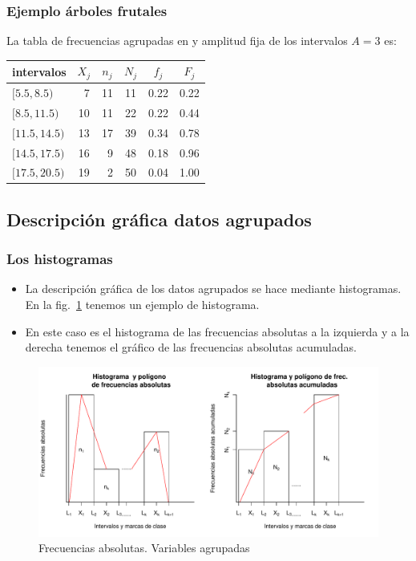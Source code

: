 \begin{frame}
\frametitle{Ejemplo árboles frutales}
La tabla de frecuencias agrupadas en  y amplitud fija de los intervalos $A=3$ es:
\begin{table}[h]
\begin{center}
\begin{tabular}{lccccc}
intervalos  & $X_j$ & $n_j$ & $N_j$ &  $f_j$ &  $F_j$ \\ \hline 
$[5.5,8.5)$  & \ 7  & 11
& 11 & 0.22 &  0.22 \\ $[8.5,11.5)$ & 10  & 11  & 22  & 0.22  & 0.44 \\ $[11.5,14.5)$ &
13 & 17  & 39  & 0.34  & 0.78 \\ $[14.5,17.5)$ & 16 & \ 9  & 48 & 0.18  & 0.96 \\
$[17.5,20.5)$ & 19   & \ 2  & 50 & 0.04  & 1.00 \\ \hline
\end{tabular}
\end{center}
\end{table}
\end{frame}

\subsection{Descripción gráfica  datos agrupados}

\begin{frame}
\frametitle{Los histogramas}
\begin{itemize}
\item La descripción gráfica  de los datos agrupados se hace mediante histogramas.
En la fig.~\ref{FAAVQC} tenemos un ejemplo de histograma.
\item En este caso es el histograma
de  las frecuencias absolutas a la izquierda y a la derecha tenemos el gráfico de las
frecuencias absolutas acumuladas.
\end{itemize}
\end{frame}

\begin{frame}
\begin{figure}
\label{FAAVQC}
\begin{center}
\includegraphics{./dibujos/01/-006}
\end{center}
\caption{Frecuencias absolutas. Variables agrupadas}
\end{figure}
\end{frame}


